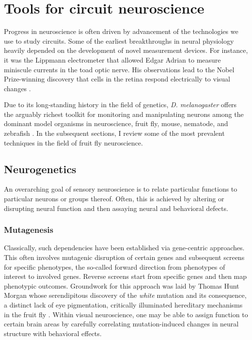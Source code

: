 \section{Tools for circuit neuroscience}
Progress in neuroscience is often driven by advancement of the technologies we use to study circuits. Some of the earliest breakthroughs in neural physiology heavily depended on the development of novel measurement devices. For instance, it was the Lippmann electrometer that allowed Edgar Adrian to measure miniscule currents in the toad optic nerve. His observations lead to the Nobel Prize-winning discovery that cells in the retina respond electrically to visual changes \citep{Adrian:1928aa}.

Due to its long-standing history in the field of genetics, \textit{D. melanogaster} offers the arguably richest toolkit for monitoring and manipulating neurons among the dominant model organisms in neuroscience, fruit fly, mouse, nematode, and zebrafish \citep{Venken:2011hf}. In the subsequent sections, I review some of the most prevalent techniques in the field of fruit fly neuroscience.

\subsection{Neurogenetics}

An overarching goal of sensory neuroscience is to relate particular functions to particular neurons or groups thereof. Often, this is achieved by altering or disrupting neural function and then assaying neural and behavioral defects.

\subsubsection{Mutagenesis}
Classically, such dependencies have been established via gene-centric approaches. This often involves mutagenic disruption of certain genes and subsequent screens for specific phenotypes, the so-called forward direction from phenotypes of interest to involved genes. Reverse screens start from specific genes and then map phenotypic outcomes. Groundwork for this approach was laid by Thomas Hunt Morgan whose serendipitous discovery of the \textit{white} mutation and its consequence, a distinct lack of eye pigmentation, critically illuminated hereditary mechanisms in the fruit fly \citep{Morgan:1910aa}. Within visual neuroscience, one may be able to assign function to certain brain areas by carefully correlating mutation-induced changes in neural structure with behavioral effects.

